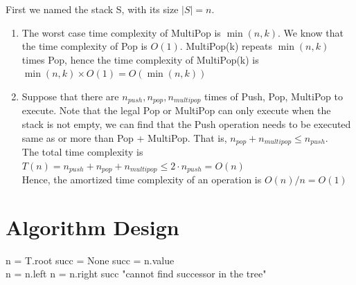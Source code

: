 \documentclass[12pt,a4paper]{article}
\begin{document}
First we named the stack S, with its size $|S|=n$.
\begin{enumerate}
    \item[(a)] The worst case time complexity of MultiPop is $\min(n, k)$. We know that the time complexity of Pop is $O(1)$. MultiPop(k) repeats $\min(n, k)$ times Pop, hence the time complexity of MultiPop(k) is $\min(n, k) \times O(1) = O(\min(n, k))$
    \item[(b)] Suppose that there are $n_{push}, n_{pop}, n_{multipop}$ times of Push, Pop, MultiPop to execute. Note that the legal Pop or MultiPop can only execute when the stack is not empty, we can find that the Push operation needs to be executed same as or more than Pop + MultiPop.
    That is, $n_{pop} + n_{multipop}\leq n_{push}$.\\
    The total time complexity is $T(n) = n_{push} + n_{pop} + n_{multipop} \leq 2\cdot n_{push} = O(n)$\\
    Hence, the amortized time complexity of an operation is $O(n)/n = O(1)$
\end{enumerate}

\section{Algorithm Design}

\begin{algorithm}
    \caption{Find successor}
    n = T.root
    succ = None
    {
        {
            succ = n.value\\
            n = n.left
        }
        {
            n = n.right
        }
    }
    {
        \Return succ
    }
    \uElse 
    {
        \Return "cannot find successor in the tree"
    }
\end{algorithm}
\end{document}
